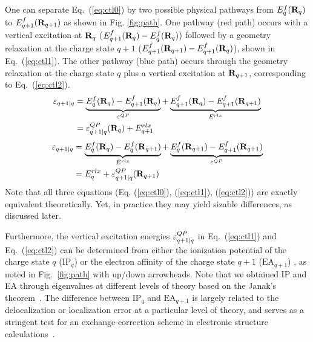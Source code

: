 One can separate Eq.~(\ref{eq:ctl0}) by two possible physical pathways from $E_q^f(\mathbf{R}_q)$ to $E_{q+1}^f(\mathbf{R}_{q+1})$ as shown in Fig. \ref{fig:path}. One pathway (red path) occurs with a vertical excitation at $\mathbf{R}_{q}$ ($E_{q+1}^f(\mathbf{R}_q)-E_q^f(\mathbf{R}_q)$) followed by a geometry relaxation at the charge state $q+1$ ($E_{q+1}^f(\mathbf{R}_{q+1})-E_{q+1}^f(\mathbf{R}_q)$), shown in Eq.~(\ref{eq:ctl1}). The other pathway (blue path) occurs through the geometry relaxation at the charge state $q$ plus a vertical excitation at $\mathbf{R}_{q+1}$, corresponding to Eq.~(\ref{eq:ctl2}).
\begin{align}
\varepsilon_{q+1|q} &= \underbrace{E_{q}^f(\mathbf{R}_q)-E_{q+1}^f(\mathbf{R}_q)}_{\varepsilon^{QP}}+\underbrace{E_{q+1}^f(\mathbf{R}_q)-E_{q+1}^f(\mathbf{R}_{q+1})}_{E^{rlx}}  \nonumber\\
&= \varepsilon^{QP}_{q+1|q}(\mathbf{R}_q) + E^{rlx}_{q+1}
\label{eq:ctl1}
\end{align}
\begin{align}
\varepsilon_{q+1|q}&=\underbrace{E_q^f(\mathbf{R}_q)-E_q^f(\mathbf{R}_{q+1})}_{E^{rlx}}+\underbrace{E_q^f(\mathbf{R}_{q+1})-E_{q+1}^f(\mathbf{R}_{q+1})}_{\varepsilon^{QP}} \nonumber\\
&= E^{rlx}_q  + \varepsilon^{QP}_{q+1|q}(\mathbf{R}_{q+1})
\label{eq:ctl2}
\end{align}
Note that all three equations (Eq. (\ref{eq:ctl0}), (\ref{eq:ctl1}), (\ref{eq:ctl2})) are exactly equivalent theoretically. Yet, in practice they may yield sizable differences, as discussed later.

Furthermore, the vertical excitation energies $\varepsilon^{QP}_{q+1|q}$ in Eq.~(\ref{eq:ctl1}) and Eq.~(\ref{eq:ctl2}) can be determined from either the ionization potential of the charge state $q$ ($\text{IP}_q$) or
the electron affinity of the charge state $q+1$ ($\text{EA}_{q+1}$)
, as noted in Fig.~\ref{fig:path} with up/down arrowheads. Note that we obtained IP and EA through eigenvalues at different levels of theory based on the Janak's theorem~\cite{janak1978proof}.
The difference between $\text{IP}_q$ and $\text{EA}_{q+1}$ is largely related to the delocalization or localization error at a particular level of theory, and serves as a stringent test for an exchange-correction scheme in electronic structure calculations~\cite{bruneval2009g}.


